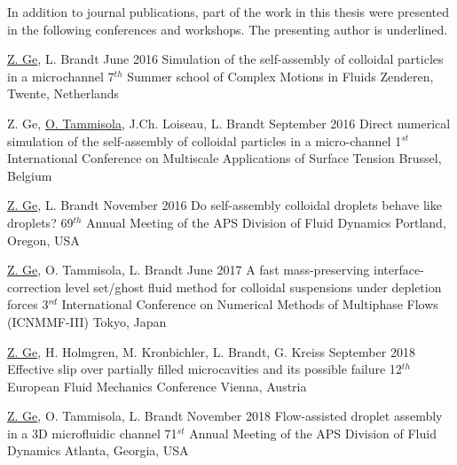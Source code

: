 %
\clearpage
\begin{conferences}
        In addition to journal publications, part of the work in this thesis were
        presented in the following conferences and workshops. The presenting author is underlined.

        \bigskip

  \conferenceitem%
    {\underline{Z. Ge}, L. Brandt}%
    {June 2016}%
    {Simulation of the self-assembly of colloidal particles in a microchannel}%
    {7$^{th}$ Summer school of Complex Motions in Fluids}%
    {Zenderen, Twente, Netherlands}%

  \conferenceitem%
    {Z. Ge, \underline{O. Tammisola}, J.Ch. Loiseau, L. Brandt}%
    {September 2016}%
    {Direct numerical simulation of the self-assembly of colloidal particles in a micro-channel}%
    {1$^{st}$ International Conference on Multiscale Applications of Surface Tension}%
    {Brussel, Belgium}%

  \conferenceitem%
    {\underline{Z. Ge}, L. Brandt}%
    {November 2016}%
    {Do self-assembly colloidal droplets behave like droplets?}%
    {69$^{th}$ Annual Meeting of the APS Division of Fluid Dynamics}%
    {Portland, Oregon, USA}%

  \conferenceitem%
    {\underline{Z. Ge}, O. Tammisola, L. Brandt}%
    {June 2017}%
    {A fast mass-preserving interface-correction level set/ghost fluid method for colloidal suspensions under depletion forces}%
    {3$^{rd}$ International Conference on Numerical Methods of Multiphase Flows (ICNMMF-III)}%
    {Tokyo, Japan}%

  \conferenceitem%
    {\underline{Z. Ge}, H. Holmgren, M. Kronbichler, L. Brandt, G. Kreiss}%
    {September 2018}%
    {Effective slip over partially filled microcavities and its possible failure}%
    {12$^{th}$ European Fluid Mechanics Conference}%
    {Vienna, Austria}%

  \conferenceitem%
    {\underline{Z. Ge}, O. Tammisola, L. Brandt}%
    {November 2018}%
    {Flow-assisted droplet assembly in a 3D microfluidic channel}%
    {71$^{st}$ Annual Meeting of the APS Division of Fluid Dynamics}%
    {Atlanta, Georgia, USA}%


\end{conferences}
